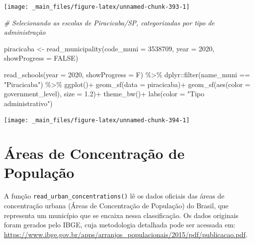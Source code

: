 \documentclass[
  brazilian,
]{book}
\newenvironment{Shaded}{\begin{snugshade}}{\end{snugshade}}
\newcommand{\AttributeTok}[1]{\textcolor[rgb]{0.77,0.63,0.00}{#1}}
\newcommand{\CommentTok}[1]{\textcolor[rgb]{0.56,0.35,0.01}{\textit{#1}}}
\newcommand{\ConstantTok}[1]{\textcolor[rgb]{0.00,0.00,0.00}{#1}}
\newcommand{\DecValTok}[1]{\textcolor[rgb]{0.00,0.00,0.81}{#1}}
\newcommand{\FloatTok}[1]{\textcolor[rgb]{0.00,0.00,0.81}{#1}}
\newcommand{\FunctionTok}[1]{\textcolor[rgb]{0.00,0.00,0.00}{#1}}
\newcommand{\NormalTok}[1]{#1}
\newcommand{\OtherTok}[1]{\textcolor[rgb]{0.56,0.35,0.01}{#1}}
\newcommand{\SpecialCharTok}[1]{\textcolor[rgb]{0.00,0.00,0.00}{#1}}
\newcommand{\StringTok}[1]{\textcolor[rgb]{0.31,0.60,0.02}{#1}}
\begin{document}
\begin{center}\texttt{[image: \_main\_files/figure-latex/unnamed-chunk-393-1]} \end{center}

\begin{Shaded}
\begin{Highlighting}[]
\CommentTok{\# Selecionando as escolas de Piracicaba/SP, categorizadas por tipo de administração}

\NormalTok{piracicaba }\OtherTok{\textless{}{-}} \FunctionTok{read\_municipality}\NormalTok{(}\AttributeTok{code\_muni =} \DecValTok{3538709}\NormalTok{,}
                                \AttributeTok{year =} \DecValTok{2020}\NormalTok{,}
                                \AttributeTok{showProgress =} \ConstantTok{FALSE}\NormalTok{)}

\FunctionTok{read\_schools}\NormalTok{(}\AttributeTok{year =} \DecValTok{2020}\NormalTok{,}
             \AttributeTok{showProgress =}\NormalTok{ F) }\SpecialCharTok{\%\textgreater{}\%}
\NormalTok{  dplyr}\SpecialCharTok{::}\FunctionTok{filter}\NormalTok{(name\_muni }\SpecialCharTok{==} \StringTok{"Piracicaba"}\NormalTok{) }\SpecialCharTok{\%\textgreater{}\%}
  \FunctionTok{ggplot}\NormalTok{()}\SpecialCharTok{+}
  \FunctionTok{geom\_sf}\NormalTok{(}\AttributeTok{data =}\NormalTok{ piracicaba)}\SpecialCharTok{+}
  \FunctionTok{geom\_sf}\NormalTok{(}\FunctionTok{aes}\NormalTok{(}\AttributeTok{color =}\NormalTok{ government\_level), }\AttributeTok{size =} \FloatTok{1.2}\NormalTok{)}\SpecialCharTok{+}
  \FunctionTok{theme\_bw}\NormalTok{()}\SpecialCharTok{+}
  \FunctionTok{labs}\NormalTok{(}\AttributeTok{color =} \StringTok{"Tipo administrativo"}\NormalTok{)}
\end{Highlighting}
\end{Shaded}

\begin{center}\texttt{[image: \_main\_files/figure-latex/unnamed-chunk-394-1]} \end{center}

\hypertarget{uxe1reas-de-concentrauxe7uxe3o-de-populauxe7uxe3o}{%
\section{Áreas de Concentração de População}\label{uxe1reas-de-concentrauxe7uxe3o-de-populauxe7uxe3o}}

A função \texttt{read\_urban\_concentrations()} lê os dados oficiais das áreas de concentração urbana (Áreas de Concentração de População) do Brasil, que representa um município que se encaixa nessa classificação. Os dados originais foram gerados pelo IBGE, cuja metodologia detalhada pode ser acessada em: \url{https://www.ibge.gov.br/apps/arranjos_populacionais/2015/pdf/publicacao.pdf}.
\end{document}
